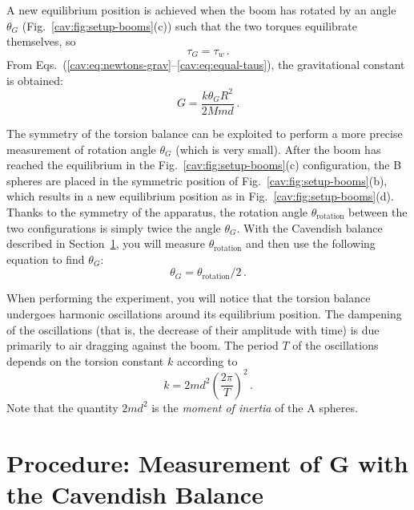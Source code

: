 A new equilibrium position is achieved when the boom has rotated by an angle $\theta_G$ (Fig.~\ref{cav:fig:setup-booms}(c)) such that the two torques equilibrate themselves, so
\begin{equation}\label{cav:eq:equal-taus}
\tau_G = \tau_w \,.
\end{equation}
From Eqs.~(\ref{cav:eq:newtons-grav}--\ref{cav:eq:equal-taus}), the gravitational constant is obtained:
\begin{equation}\label{cav:eq:final-g}
G = \frac{k \theta_G R^2}{2 M m d}\,.
\end{equation}

The symmetry of the torsion balance can be exploited to perform a more precise
measurement of rotation angle $\theta_G$ (which is very small). After the boom has reached the
equilibrium in the Fig.~\ref{cav:fig:setup-booms}(c) configuration, the B spheres are placed in the symmetric position of Fig.~\ref{cav:fig:setup-booms}(b), which results in a new equilibrium position as in Fig.~\ref{cav:fig:setup-booms}(d).
Thanks to the symmetry of the apparatus, the rotation angle $\theta_\textrm{rotation}$ between the two
configurations is simply twice the angle $\theta_G$. With the Cavendish balance described in
Section~\ref{cav:sec:measurement}, you will measure $\theta_\textrm{rotation}$ and then use the following equation to find $\theta_G$:
\begin{equation}\label{cav:eq:theta-g}
 \theta_G = \theta_\textrm{rotation} / 2 \,.
\end{equation}

When performing the experiment, you will notice that the torsion balance undergoes
harmonic oscillations around its equilibrium position. The dampening of the oscillations
(that is, the decrease of their amplitude with time) is due primarily to air dragging against
the boom. The period $T$ of the oscillations depends on the torsion constant $k$ according to
\begin{equation}\label{cav:eq:k}
 k = 2 m d^2 \left( \frac{2 \pi}{T} \right)^2 \,.
\end{equation}
Note that the quantity $2 m d^2$ is the \textit{moment of inertia} of the A spheres.

\section{Procedure: Measurement of $\bm{G}$ with the Cavendish Balance}\label{cav:sec:measurement}


